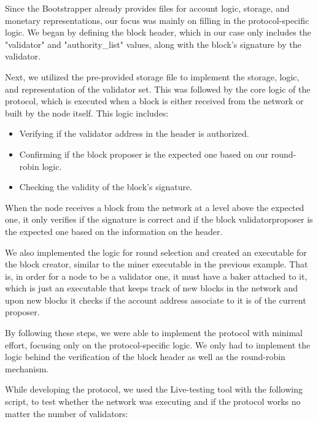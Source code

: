 Since the Bootstrapper already provides files for account logic, storage, and monetary representations, our focus was mainly on filling in the protocol-specific logic. We began by defining the block header, which in our case only includes the "validator" and "authority\_list" values, along with the block's signature by the validator.

Next, we utilized the pre-provided storage file to implement the storage, logic, and representation of the validator set. This was followed by the core logic of the protocol, which is executed when a block is either received from the network or built by the node itself. This logic includes:

\begin{itemize}
    \item Verifying if the validator address in the header is authorized.
    \item Confirming if the block proposer is the expected one based on our round-robin logic.
    \item Checking the validity of the block's signature.
\end{itemize}

When the node receives a block from the network at a level above the expected one, it only verifies if the signature is correct and if the block validator\/proposer is the expected one based on the information on the header.


We also implemented the logic for round selection and created an executable for the block creator, similar to the miner executable in the previous example. That is, in order for a node to be a validator one, it must have a baker attached to it, which is just an executable that keeps track of new blocks in the network and upon new blocks it checks if the account address associate to it is of the current proposer.

By following these steps, we were able to implement the protocol with minimal effort, focusing only on the protocol-specific logic. We only had to implement the logic behind the verification of the block header as well as the round-robin  mechanism.

While developing the protocol, we used the Live-testing tool with the following script, to test whether the network was executing and if the protocol works no matter the number of validators:

